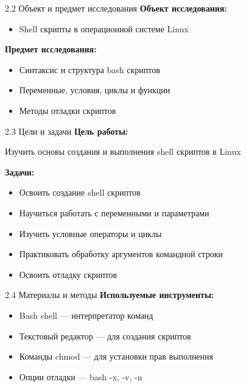 \documentclass[
  ignorenonframetext,
  aspectratio=169,
  russian,
]{beamer}
\providecommand{\tightlist}{%
  \setlength{\itemsep}{0pt}\setlength{\parskip}{0pt}}
\begin{document}
\begin{frame}{2.2 Объект и предмет исследования}
\label{ux43eux431ux44aux435ux43aux442-ux438-ux43fux440ux435ux434ux43cux435ux442-ux438ux441ux441ux43bux435ux434ux43eux432ux430ux43dux438ux44f}
\textbf{Объект исследования:}

\begin{itemize}[<+->]
\tightlist
\item
  Shell скрипты в операционной системе Linux
\end{itemize}

\textbf{Предмет исследования:}

\begin{itemize}[<+->]
\tightlist
\item
  Синтаксис и структура bash скриптов
\item
  Переменные, условия, циклы и функции
\item
  Методы отладки скриптов
\end{itemize}
\end{frame}

\begin{frame}{2.3 Цели и задачи}
\label{ux446ux435ux43bux438-ux438-ux437ux430ux434ux430ux447ux438}
\textbf{Цель работы:}

Изучить основы создания и выполнения shell скриптов в Linux

\textbf{Задачи:}

\begin{itemize}[<+->]
\tightlist
\item
  Освоить создание shell скриптов
\item
  Научиться работать с переменными и параметрами
\item
  Изучить условные операторы и циклы
\item
  Практиковать обработку аргументов командной строки
\item
  Освоить отладку скриптов
\end{itemize}
\end{frame}

\begin{frame}{2.4 Материалы и методы}
\label{ux43cux430ux442ux435ux440ux438ux430ux43bux44b-ux438-ux43cux435ux442ux43eux434ux44b}
\textbf{Используемые инструменты:}

\begin{itemize}[<+->]
\tightlist
\item
  Bash shell --- интерпретатор команд
\item
  Текстовый редактор --- для создания скриптов
\item
  Команды chmod --- для установки прав выполнения
\item
  Опции отладки --- bash -x, -v, -n
\end{itemize}
\end{frame}
\end{document}
